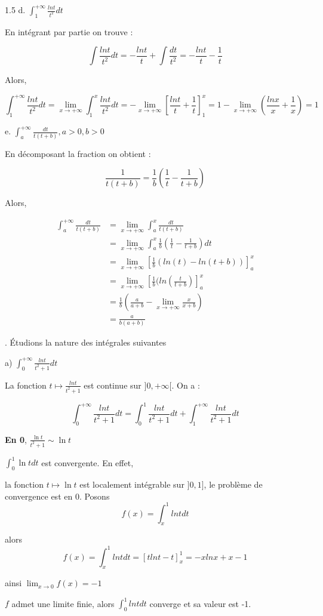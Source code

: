 \documentclass[12pt]{article}
\begin{document}
\begin{spacing}{1.5}
d. $\int_{1}^{+\infty}\frac{lnt}{t^2}dt$

En intégrant par partie on trouve :

\[\int\frac{lnt}{t^2}dt=-\frac{lnt}{t}+\int\frac{dt}{t^2}=-\frac{lnt}{t}-\frac{1}{t}\]

Alors,

\[\int_{1}^{+\infty}\frac{lnt}{t^2}dt=\lim_{x\to +\infty}\int_{1}^{x}\frac{lnt}{t^2}dt=-\lim_{x\to +\infty}\left[\frac{lnt}{t}+\frac{1}{t}\right]_1^x=1-\lim_{x\to +\infty}(\frac{lnx}{x}+\frac{1}{x})=1\]

e. $\int_{a}^{+\infty}\frac{dt}{t(t+b)},a>0,b>0$

En décomposant la fraction on obtient : 

\[\frac{1}{t(t+b)}=\frac{1}{b}(\frac{1}{t}-\frac{1}{t+b})\]

Alors, 

\begin{align*}
\int_{a}^{+\infty}\frac{dt}{t(t+b)}&=\lim_{x\to +\infty}\int_{a}^{x}\frac{dt}{t(t+b)}\\
&=\lim_{x\to +\infty}\int_{a}^{x}\frac{1}{b}(\frac{1}{t}-\frac{1}{t+b})dt\\
&=\lim_{x\to +\infty}[\frac{1}{b}(ln(t)-ln(t+b))]_a^x\\
&=\lim_{x\to +\infty}[\frac{1}{b}(ln(\frac{t}{t+b})]_a^x\\
&=\frac{1}{b}(\frac{a}{a+b}-\lim_{x\to +\infty}\frac{x}{x+b})\\
&=\frac{a}{b(a+b)}
\end{align*}

. Étudions la nature des intégrales suivantes

a) $\int_0^{+\infty}\frac{lnt}{t^2+1}dt$

La fonction $t\mapsto\frac{lnt}{t^2+1}$ est continue sur $]0,+\infty[$. On a :

\[\int_0^{+\infty}\frac{lnt}{t^2+1}dt=\int_0^{1}\frac{lnt}{t^2+1}dt+\int_1^{+\infty}\frac{lnt}{t^2+1}dt\]

\textbf{En 0}, $\frac{\ln t}{t^2+1}\sim \ln t$

$\int_0^{1}\ln tdt$ est convergente. En effet, 

la fonction $t\mapsto \ln t$ est localement intégrable sur $]0,1]$, le problème de convergence est en 0. Posons \[f(x)=\int_x^{1}lntdt\]

alors \[f(x)=\int_x^{1}lntdt=[tlnt-t]_x^1=-xlnx+x-1\]

ainsi $\lim_{x\to 0}f(x)=-1$

$f$ admet une limite finie, alors $\int_0^{1}lntdt$ converge et sa valeur est -1.


\end{spacing}
\end{document}

